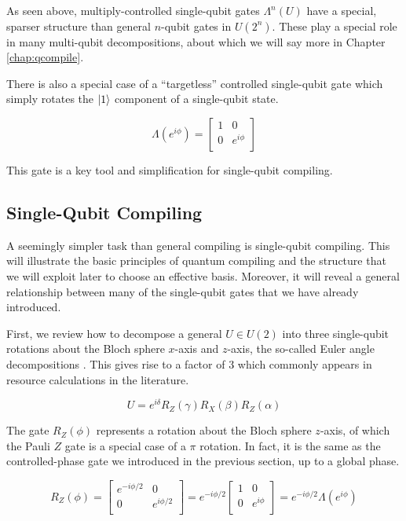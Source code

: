 As seen above, multiply-controlled single-qubit gates $\Lambda^n(U)$ have a
special, sparser structure than general $n$-qubit gates in $U(2^n)$.
These play a special role in many multi-qubit decompositions, about which
we will say more in Chapter \ref{chap:qcompile}.

There is also a special case of a ``targetless'' controlled single-qubit
gate which simply rotates the $\left\vert{1}\right\rangle$ component of a single-qubit state.

\begin{equation}
\Lambda(e^{i\phi}) = 
 \left[
  \begin{array}{cc}
    1 & 0 \\
    0 & e^{i\phi} \\
  \end{array} \right]
\end{equation}

This gate is a key tool and simplification for single-qubit compiling.

\subsection{Single-Qubit Compiling}
\label{subsec:qcompile-single}

A seemingly simpler task than general compiling is single-qubit compiling.
This will illustrate the basic principles of quantum compiling and the
structure that we will exploit later to choose an effective basis. Moreover,
it will reveal a general relationship between many of the single-qubit
gates that we have already introduced.

First, we review how to decompose a general $U \in U(2)$ into three single-qubit
rotations about the Bloch sphere $x$-axis and $z$-axis, the so-called
Euler angle decompositions \cite{Nielsen2000}. This gives rise to a factor of $3$
which commonly appears in resource calculations in the literature.

\begin{equation}
U = e^{i\delta}R_Z(\gamma)R_X(\beta)R_Z(\alpha)
\end{equation}

The gate $R_Z(\phi)$ represents a rotation about the Bloch sphere $z$-axis,
of which the Pauli $Z$ gate is a special case of a $\pi$ rotation. In fact,
it is the same as the controlled-phase gate we introduced in the previous section,
up to a global phase.

\begin{equation}
R_Z(\phi) =
\left[
  \begin{array}{cc}
    e^{-i\phi/2} & 0 \\
    0 & e^{i\phi/2} \\
  \end{array} \right]
=
e^{-i\phi / 2} \left[
  \begin{array}{cc}
    1 & 0 \\
    0 & e^{i\phi} \\
  \end{array} \right]
= e^{-i\phi / 2} \Lambda(e^{i\phi})
\end{equation}

